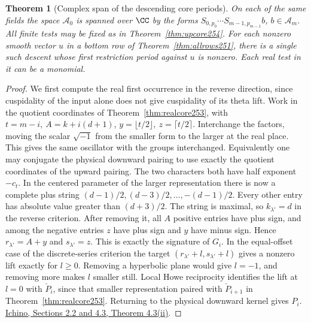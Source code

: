 \documentclass[a4paper,11pt]{article}
\newtheorem{theorem}[proposition]{Theorem}
\theoremstyle{definition}
\theoremstyle{remark}
\numberwithin{equation}{section}
\begin{document}
\begin{theorem}[Complex span of the descending core periods]\leavevmode
\label{thm:downcore254}
On each of the same fields the space \(\mathcal A_0\) is spanned
over \(\CC\) by the forms
\(S_{0,p_0}\cdots S_{m-1,p_{m-1}}b\), \(b\in\mathcal A_m\).
All finite tests may be fixed as in Theorem~\ref{thm:upcore254}.
For each nonzero smooth vector \(u\) in a bottom row of
Theorem~\ref{thm:allrows251}, there is a single such descent
whose first restriction period against \(u\) is nonzero.
Each real test in it can be a monomial.
\end{theorem}
\begin{proof}
We first compute the real first occurrence in the reverse
direction, since cuspidality of the input alone does not give
cuspidality of its theta lift. Work in the quotient coordinates
of Theorem~\ref{thm:realcore253}, with \(t=m-i,\ A=k+i(d+1)\),
\(y=\lfloor t/2\rfloor,\ z=\lceil t/2\rceil\). Interchange
the factors, moving the scalar \(\sqrt{-1}\) from the smaller form to
the larger at the real place. This gives the same oscillator
with the groups interchanged. Equivalently one may conjugate
the physical downward pairing to use exactly the quotient
coordinates of the upward pairing. The two characters both
have half exponent \(-c_t\).
In the centered parameter of the larger representation there
is now a complete plus string
\((d-1)/2,(d-3)/2,\ldots,-(d-1)/2\).
Every other entry has absolute value greater than \((d+3)/2\).
The string is maximal, so \(k_{\lambda'}=d\) in the reverse
criterion. After removing it, all \(A\) positive entries have
plus sign, and among the negative entries \(z\) have plus sign
and \(y\) have minus sign. Hence \(r_{\lambda'}=A+y\) and
\(s_{\lambda'}=z\). This is exactly the signature of \(G_i\).
In the equal-offset case of the discrete-series criterion the
target \((r_{\lambda'}+l,s_{\lambda'}+l)\) gives a nonzero
lift exactly for \(l\ge0\). Removing a hyperbolic plane would
give \(l=-1\), and removing more makes \(l\) smaller still.
Local Howe reciprocity identifies the lift at \(l=0\) with
\(\check P_i\), since that smaller representation paired with
\(\check P_{i+1}\) in Theorem~\ref{thm:realcore253}. Returning
to the physical downward kernel gives \(P_i\).
\href{https://arxiv.org/pdf/2002.09148}{Ichino, Sections 2.2
and 4.3, Theorem 4.3(ii)}.


\end{proof}
\end{document}

